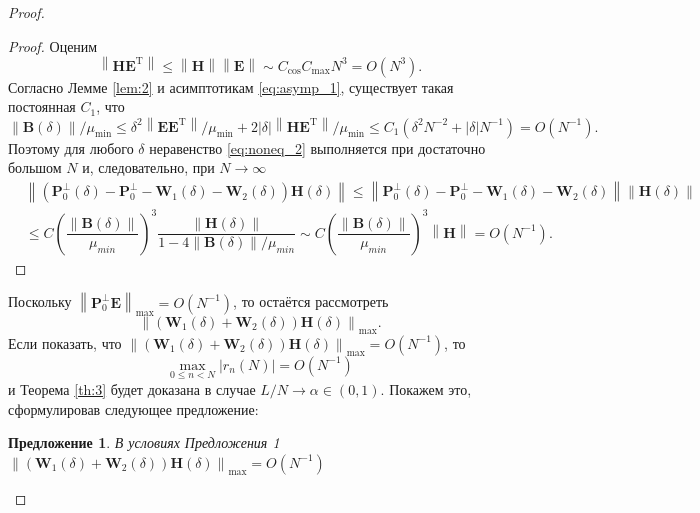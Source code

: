 \documentclass[specialist,
substylefile = spbu_report.rtx,
subf,href,colorlinks=true, 12pt]{disser}
\newcommand\norm[1]{\left\|#1\right\|}
\newtheorem{sentence}{Предложение}
\begin{document}
\begin{proof}
		\begin{proof}
			Оценим 
			\begin{equation*}
				\norm{\mathbf{HE}^\mathrm{T}}\leqslant\norm{\mathbf{H}}\norm{\mathbf{E}}\sim C_{\cos}C_{\max}N^3 = O(N^3).
			\end{equation*}
			Согласно Лемме \ref{lem:2} и асимптотикам \eqref{eq:asymp_1}, существует такая постоянная $C_1$, что
			\begin{equation*}
				\norm{\mathbf{B}(\delta)}/\mu_{\min}\leqslant\delta^2\norm{\mathbf{EE}^\mathrm{T}}/\mu_{\min}+2|\delta|\norm{\mathbf{HE}^\mathrm{T}}/\mu_{\min}\leqslant C_1(\delta^2N^{-2}+|\delta|N^{-1})=O(N^{-1}).
			\end{equation*}
			Поэтому для любого $\delta$ неравенство \eqref{eq:noneq_2} выполняется при достаточно большом $N$ и, следовательно, при $N\rightarrow\infty$
			\begin{align*}
				&\norm{(\mathbf{P}_0^\bot(\delta)-\mathbf{P}_0^\bot-\mathbf{W}_1(\delta)-\mathbf{W}_2(\delta))\mathbf{H}(\delta)}\leqslant\norm{\mathbf{P}_0^\bot(\delta)-\mathbf{P}_0^\bot-\mathbf{W}_1(\delta)-\mathbf{W}_2(\delta)}\norm{\mathbf{H}(\delta)}
				\\
				&\leqslant C\left(\dfrac{\norm{\mathbf{B}(\delta)}}{\mu_{min}}\right)^3\dfrac{\norm{\mathbf{H}(\delta)}}{1-4\norm{\mathbf{B}(\delta)}/\mu_{min}}\sim C\left(\dfrac{\norm{\mathbf{B}(\delta)}}{\mu_{min}}\right)^3\norm{\mathbf{H}} = O(N^{-1}).
			\end{align*}
		\end{proof}
		Поскольку $\norm{\mathbf{P}_0^\bot\mathbf{E}}_{\max} = O(N^{-1})$, то остаётся рассмотреть~ \begin{equation*}
			\norm{(\mathbf{W}_1(\delta) + \mathbf{W}_2(\delta))\mathbf{H}(\delta)}_{\max}. 
		\end{equation*}
		Если показать, что $\norm{(\mathbf{W}_1(\delta) + \mathbf{W}_2(\delta))\mathbf{H}(\delta)}_{\max} = O(N^{-1})$, то 
		\begin{equation*}
			\max_{0\leqslant n<N}|r_n(N)|=O(N^{-1})
		\end{equation*}
		и Теорема \ref{th:3} будет доказана в случае $L/N\rightarrow\alpha\in(0,1)$.
		Покажем это, сформулировав следующее предложение:
		\begin{sentence}
			В условиях Предложения 1 $\norm{(\mathbf{W}_1(\delta)+\mathbf{W}_2(\delta))\mathbf{H}(\delta)}_{\max}=O(N^{-1})$
		\end{sentence}
		

\end{proof}
\end{document}
